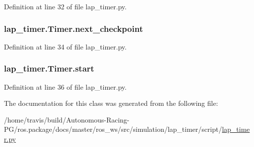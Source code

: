 Definition at line 32 of file lap\+\_\+timer.\+py.

\subsubsection[{\texorpdfstring{next\+\_\+checkpoint}{next_checkpoint}}]{\setlength{\rightskip}{0pt plus 5cm}lap\+\_\+timer.\+Timer.\+next\+\_\+checkpoint}\hypertarget{classlap__timer_1_1_timer_a14f57c27d32e7e7591b38708c68a9e98}{}\label{classlap__timer_1_1_timer_a14f57c27d32e7e7591b38708c68a9e98}


Definition at line 34 of file lap\+\_\+timer.\+py.

\subsubsection[{\texorpdfstring{start}{start}}]{\setlength{\rightskip}{0pt plus 5cm}lap\+\_\+timer.\+Timer.\+start}\hypertarget{classlap__timer_1_1_timer_a3543c782f954f47c01b2068674bfe96b}{}\label{classlap__timer_1_1_timer_a3543c782f954f47c01b2068674bfe96b}


Definition at line 36 of file lap\+\_\+timer.\+py.



The documentation for this class was generated from the following file\+:\begin{DoxyCompactItemize}
\item 
/home/travis/build/\+Autonomous-\/\+Racing-\/\+P\+G/ros.\+package/docs/master/ros\+\_\+ws/src/simulation/lap\+\_\+timer/script/\hyperlink{lap__timer_8py}{lap\+\_\+timer.\+py}\end{DoxyCompactItemize}

